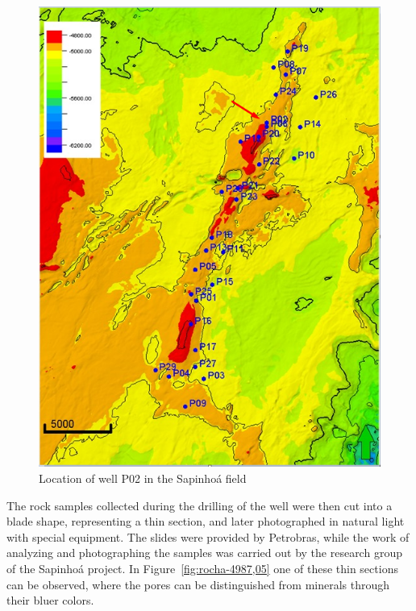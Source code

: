 \documentclass[a4paper,fleqn]{cas-sc}
\begin{document}
\begin{figure}[h!]
	\caption{Location of well P02 in the Sapinhoá field}
	\label{fig:sapinhoa}
	\centering%
	\begin{minipage}{0.5\textwidth}
		\includegraphics[width=\textwidth]{images/sapinhoa.png}
	\end{minipage}
\end{figure}

The rock samples collected during the drilling of the well were then cut into a blade shape, representing a thin section, and later photographed in natural light with special equipment. The slides were provided by Petrobras, while the work of analyzing and photographing the samples was carried out by the research group of the Sapinhoá project. In Figure~\ref{fig:rocha-4987,05} one of these thin sections can be observed, where the pores can be distinguished from minerals through their bluer colors.
\end{document}
